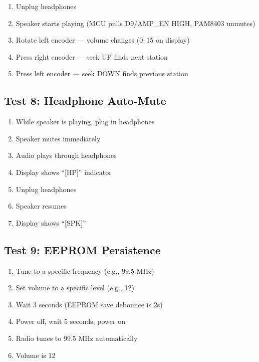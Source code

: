 \documentclass[a4paper,11pt]{article}
\renewcommand*{\,}{ }%
\begin{document}
\begin{enumerate}
    \item Unplug headphones
    \item[$\square$] Speaker starts playing (MCU pulls D9/AMP\_EN HIGH, PAM8403 unmutes)
    \item[$\square$] Rotate left encoder --- volume changes (0--15 on display)
    \item[$\square$] Press right encoder --- seek UP finds next station
    \item[$\square$] Press left encoder --- seek DOWN finds previous station
\end{enumerate}

\subsection{Test 8: Headphone Auto-Mute}

\begin{enumerate}
    \item While speaker is playing, plug in headphones
    \item[$\square$] Speaker mutes immediately
    \item[$\square$] Audio plays through headphones
    \item[$\square$] Display shows ``[HP]'' indicator
    \item Unplug headphones
    \item[$\square$] Speaker resumes
    \item[$\square$] Display shows ``[SPK]''
\end{enumerate}

\subsection{Test 9: EEPROM Persistence}

\begin{enumerate}
    \item Tune to a specific frequency (e.g., 99.5 MHz)
    \item Set volume to a specific level (e.g., 12)
    \item Wait 3 seconds (EEPROM save debounce is 2s)
    \item Power off, wait 5 seconds, power on
    \item[$\square$] Radio tunes to 99.5 MHz automatically
    \item[$\square$] Volume is 12
\end{enumerate}
\end{document}
